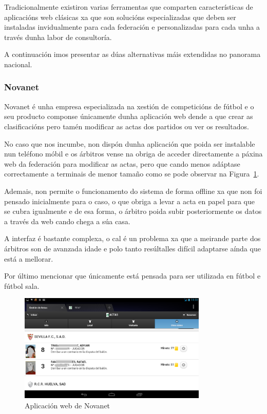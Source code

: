     Tradicionalmente existiron varias ferramentas que comparten características 
de aplicacións web clásicas xa que son solucións especializadas que deben ser 
instaladas invidualmente para cada federación e personalizadas para cada unha a 
través dunha labor de consultoría.

    A continuación imos presentar as dúas alternativas máis extendidas no 
panorama nacional.

      \subsubsection{Novanet}
      Novanet é unha empresa especializada na xestión de competicións de fútbol 
e o seu producto componse únicamente dunha aplicación web dende a que crear as 
clasificacións pero tamén modificar as actas dos partidos ou ver os resultados.

      No caso que nos incumbe, non dispón dunha aplicación que poida ser instalable nun 
teléfono móbil e os árbitros vense na obriga de acceder directamente a páxina web da 
federación para modificar as actas, pero que cando menos adáptase correctamente 
a terminais de menor tamaño como se pode observar na 
Figura~\ref{fig:img:novanet}.

      Ademais, non permite o funcionamento do sistema de forma offline xa que 
non foi pensado inicialmente para o caso, o que obriga a levar a acta en papel 
para que se cubra igualmente e de esa forma, o árbitro poida 
subir posteriormente os datos a través da web cando chega a súa casa.

      A interfaz é bastante complexa, o cal é un problema xa que a meirande parte dos 
árbitros son de avanzada idade e polo tanto resúltalles difícil adaptarse 
aínda que está a mellorar.

      Por último mencionar que únicamente está pensada para ser utilizada en 
fútbol e fútbol sala.
	
      \begin{figure}[h!]
	\begin{center}
	  \includegraphics[width=0.8\textwidth]{./img/novanet-app.png}
	  \caption{Aplicación web de Novanet}
	  \label{fig:img:novanet}
	\end{center}
      \end{figure}

